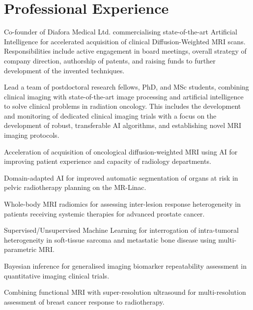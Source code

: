 \documentclass[]{mbcv}
\begin{document}
\begin{minipage}[t]{0.65\textwidth}

\section{Professional Experience}
Co-founder of Diafora Medical Ltd. commercialising state-of-the-art Artificial Intelligence for accelerated acquisition of clinical Diffusion-Weighted MRI scans. Responsibilities include active engagement in board meetings, overall strategy of company direction, authorship of patents, and raising funds to further development of the invented techniques.

\vspace{10pt}

Lead a team of postdoctoral research fellows,  PhD, and MSc students, combining clinical imaging with state-of-the-art image processing and artificial intelligence to solve clinical problems in radiation oncology. This includes the development and monitoring of dedicated clinical imaging trials with a focus on the development of robust, transferable AI algorithms, and establishing novel MRI imaging protocols.
 
\vspace*{20pt}
\begin{tightemize}
\item Acceleration of acquisition of oncological diffusion-weighted MRI using AI for improving patient experience and capacity of radiology departments.
\item Domain-adapted AI for improved automatic segmentation of organs at risk in pelvic radiotherapy planning on the MR-Linac.
\item Whole-body MRI radiomics for assessing inter-lesion response heterogeneity in patients receiving systemic therapies for advanced prostate cancer.
\item Supervised/Unsupervised Machine Learning for interrogation of intra-tumoral heterogeneity in soft-tissue sarcoma and metastatic bone disease using multi-parametric MRI.
\item Bayesian inference for generalised imaging biomarker repeatability assessment in quantitative imaging clinical trials.
\item Combining functional MRI with super-resolution ultrasound for multi-resolution assessment of breast cancer response to radiotherapy.
\end{tightemize}


\end{minipage}
\end{document}

